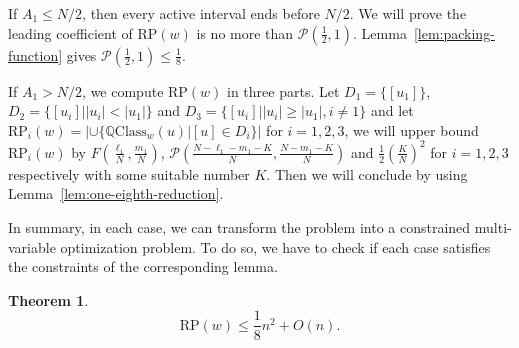 \documentclass[runningheads,envcountsame,a4paper]{llncs}
\newtheorem{thm}{Theorem}
\newcommand{\qcl}{\mathbb{Q}\mathrm{Class}}
\newcommand{\rp}{\mathrm{RP}}
\begin{document}
If \(A_1\le N/2\), then every active interval ends before \(N/2\). We will prove the leading coefficient of $\rp(w)$ is no more than $\mathcal P\left(\frac12,1\right)$.
Lemma~\ref{lem:packing-function} gives
\(
\mathcal P\left(\frac12,1\right)\le \frac18.
\)

If \(A_1>N/2\), we compute $\rp(w)$ in three parts. Let $D_1=\{[u_1]\}$, $D_2=\{[u_i]||u_i|<|u_1|\}$ and $D_3=\{[u_i]||u_i|\ge |u_1|, i \ne 1\}$ and let $\rp_i(w)=|\cup \{\qcl_w(u)| [u] \in D_i \}|$ for $i=1,2,3$, we will upper bound $\rp_i(w)$ by $F(\frac{\ell_1}{N},\frac{m_1}{N})$, $\mathcal P(\frac{N-\ell_1-m_1-K}{N},\frac{N-m_1-K}{N})$ and $\frac12(\frac{K}{N})^2$ for $i=1,2,3$ respectively with some suitable number $K$. Then we will conclude by using Lemma~\ref{lem:one-eighth-reduction}.

In summary, in each case, we can transform the problem into a constrained multi-variable optimization problem. To do so, we have to check if each case satisfies the constraints of the corresponding lemma.

\begin{thm}\label{thm:rational-power-eighth}
\[
\rp(w)\le \frac18 n^2+O(n).
\]
\end{thm}
\end{document}
